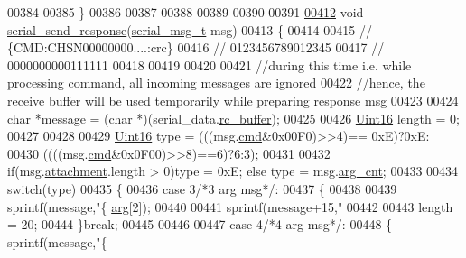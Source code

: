 \begin{DoxyCode}
00384 
00385 \}
00386 
00387 
00388 
00389 
00390 
00391 
\hypertarget{a00028_source_l00412}{}\hyperlink{a00028_a96a3f016ca5b0736424c2695fe9fbdf8}{00412} \textcolor{keywordtype}{void}   \hyperlink{a00028_a96a3f016ca5b0736424c2695fe9fbdf8}{serial\_send\_response}(\hyperlink{a00029_d2/d87/a00759}{serial\_msg\_t} msg)
00413 \{
00414   
00415     \textcolor{comment}{// \{CMD:CHSN00000000....:crc\}}
00416     \textcolor{comment}{// 0123456789012345}
00417     \textcolor{comment}{// 0000000000111111}
00418 
00419 
00420 
00421    \textcolor{comment}{//during this time i.e. while processing command, all incoming messages are ignored}
00422    \textcolor{comment}{//hence, the receive buffer will be used temporarily while preparing response msg}
00423 
00424    \textcolor{keywordtype}{char}   *message = (\textcolor{keywordtype}{char} *)(serial\_data.\hyperlink{a00028_ac734cb8be27f86bd99edc539434883a4}{rc\_buffer});
00425 
00426    \hyperlink{a00070_a59a9f6be4562c327cbfb4f7e8e18f08b}{Uint16}  length = 0;
00427 
00428 
00429   \hyperlink{a00070_a59a9f6be4562c327cbfb4f7e8e18f08b}{Uint16} type =  (((msg.\hyperlink{a00029_a13c351e37c82b2434e5ce4421012ffd6}{cmd}&0x00F0)>>4)== 0xE)?0xE:
00430                  ((((msg.\hyperlink{a00029_a13c351e37c82b2434e5ce4421012ffd6}{cmd}&0x0F00)>>8)==6)?6:3);
00431 
00432  \textcolor{keywordflow}{if}(msg.\hyperlink{a00029_a040f6d5d58d18d8aeaf447eda7f50172}{attachment}.length > 0)type = 0xE; \textcolor{keywordflow}{else} type = msg.\hyperlink{a00029_a7b79f40e2eeec288091afd340bf8f591}{arg\_cnt};
00433 
00434  \textcolor{keywordflow}{switch}(type)
00435    \{
00436        \textcolor{keywordflow}{case} 3\textcolor{comment}{/*3 arg msg*/}:
00437        \{
00438 
00439        sprintf(message,\textcolor{stringliteral}{"\{%
      \hyperlink{a00029_af7d6f762438c80072bd9dc0e4dd4ae1e}{arg}[2]);
00440 
00441        sprintf(message+15,\textcolor{stringliteral}{"%
00442 
00443        length = 20;
00444        \}\textcolor{keywordflow}{break};
00445 
00446 
00447        \textcolor{keywordflow}{case} 4\textcolor{comment}{/*4 arg msg*/}:
00448        \{    sprintf(message,\textcolor{stringliteral}{"\{%
}}}
\end{DoxyCode}
